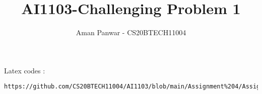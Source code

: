 \documentclass[journal,12pt,twocolumn]{IEEEtran}
\DeclareMathOperator*{\Res}{Res}
\begin{document}
\newcommand{\BEQA}{\begin{eqnarray}}
\newcommand{\EEQA}{\end{eqnarray}}
\newcommand{\define}{\stackrel{\triangle}{=}}

\raggedbottom
\setlength{\parindent}{0pt}
\providecommand{\mbf}{\mathbf}
\providecommand{\pr}[1]{\ensuremath{\Pr\left(#1\right)}}
\providecommand{\qfunc}[1]{\ensuremath{Q\left(#1\right)}}
\providecommand{\sbrak}[1]{\ensuremath{{}\left[#1\right]}}
\providecommand{\lsbrak}[1]{\ensuremath{{}\left[#1\right.}}
\providecommand{\rsbrak}[1]{\ensuremath{{}\left.#1\right]}}
\providecommand{\brak}[1]{\ensuremath{\left(#1\right)}}
\providecommand{\lbrak}[1]{\ensuremath{\left(#1\right.}}
\providecommand{\rbrak}[1]{\ensuremath{\left.#1\right)}}
\providecommand{\cbrak}[1]{\ensuremath{\left\{#1\right\}}}
\providecommand{\lcbrak}[1]{\ensuremath{\left\{#1\right.}}
\providecommand{\rcbrak}[1]{\ensuremath{\left.#1\right\}}}
\theoremstyle{remark}
\newtheorem{rem}{Remark}
\newcommand{\sgn}{\mathop{\mathrm{sgn}}}
\providecommand{\abs}[1]{\vert#1\vert}
\providecommand{\res}[1]{\Res\displaylimits_{#1}} 
\providecommand{\norm}[1]{\lVert#1\rVert}
\providecommand{\mtx}[1]{\mathbf{#1}}
\providecommand{\mean}[1]{E[ #1 ]}
\providecommand{\fourier}{\overset{\mathcal{F}}{ \rightleftharpoons}}
\providecommand{\system}{\overset{\mathcal{H}}{ \longleftrightarrow}}
\newcommand{\solution}{\noindent \textbf{Solution: }}
\newcommand{\cosec}{\,\text{cosec}\,}
\providecommand{\dec}[2]{\ensuremath{\overset{#1}{\underset{#2}{\gtrless}}}}
\newcommand{\myvec}[1]{\ensuremath{\begin{pmatrix}#1\end{pmatrix}}}
\newcommand{\mydet}[1]{\ensuremath{\begin{vmatrix}#1\end{vmatrix}}}
\makeatletter
{}
\makeatother
\let\StandardTheFigure\thefigure
\let\vec\mathbf
\renewcommand{\thefigure}{\theproblem}
\def\putbox#1#2#3{\makebox[0in][l]{\makebox[#1][l]{}\raisebox{\baselineskip}[0in][0in]{\raisebox{#2}[0in][0in]{#3}}}}
     \def\rightbox#1{\makebox[0in][r]{#1}}
     \def\centbox#1{\makebox[0in]{#1}}
     \def\topbox#1{\raisebox{-\baselineskip}[0in][0in]{#1}}
     \def\midbox#1{\raisebox{-0.5\baselineskip}[0in][0in]{#1}}
\vspace{3cm}
\title{AI1103-Challenging Problem 1}
\author{Aman Panwar - CS20BTECH11004}
\maketitle
\newpage
\bigskip
\renewcommand{\thefigure}{\theenumi}
\renewcommand{\thetable}{\theenumi}
%
Latex codes : 
%
\begin{lstlisting}
https://github.com/CS20BTECH11004/AI1103/blob/main/Assignment%204/Assignment%204.tex
\end{lstlisting}
\end{document}
